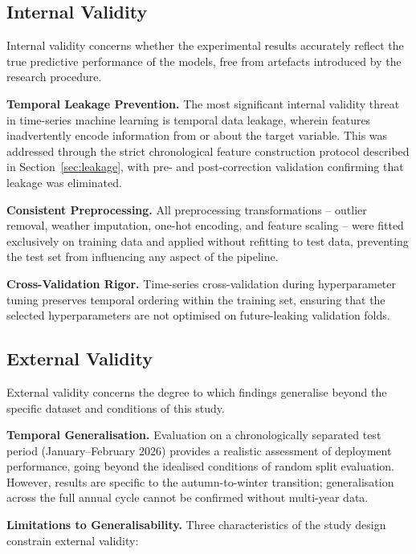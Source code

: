 \documentclass{report}
\begin{document}
\subsection{Internal Validity}

Internal validity concerns whether the experimental results accurately
reflect the true predictive performance of the models, free from artefacts
introduced by the research procedure.

\textbf{Temporal Leakage Prevention.}  The most significant internal validity
threat in time-series machine learning is temporal data leakage, wherein
features inadvertently encode information from or about the target variable.
This was addressed through the strict chronological feature construction
protocol described in Section~\ref{sec:leakage}, with pre- and
post-correction validation confirming that leakage was eliminated.

\textbf{Consistent Preprocessing.}  All preprocessing transformations --
outlier removal, weather imputation, one-hot encoding, and feature scaling --
were fitted exclusively on training data and applied without refitting to test
data, preventing the test set from influencing any aspect of the pipeline.

\textbf{Cross-Validation Rigor.}  Time-series cross-validation during
hyperparameter tuning preserves temporal ordering within the training set,
ensuring that the selected hyperparameters are not optimised on future-leaking
validation folds.

\subsection{External Validity}

External validity concerns the degree to which findings generalise beyond the
specific dataset and conditions of this study.

\textbf{Temporal Generalisation.}  Evaluation on a chronologically separated
test period (January--February 2026) provides a realistic assessment of
deployment performance, going beyond the idealised conditions of random split
evaluation.  However, results are specific to the autumn-to-winter transition;
generalisation across the full annual cycle cannot be confirmed without
multi-year data.

\textbf{Limitations to Generalisability.}  Three characteristics of the study
design constrain external validity:
\end{document}
